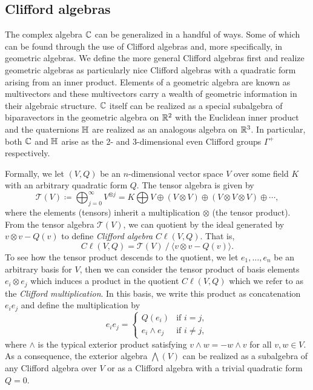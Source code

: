 \subsection{Clifford algebras}
The complex algebra $\mathbb{C}$ can be generalized in a handful of ways.  Some of which can be found through the use of Clifford algebras and, more specifically, in geometric algebras.  We define the more general Clifford algebras first and realize geometric algebras as particularly nice Clifford algebras with a quadratic form arising from an inner product. Elements of a geometric algebra are known as multivectors and these multivectors carry a wealth of geometric information in their algebraic structure. $\mathbb{C}$ itself can be realized as a special subalgebra of biparavectors in the geometric algebra on $\mathbb{R}^2$ with the Euclidean inner product and the quaternions $\mathbb{H}$ are realized as an analogous algebra on $\mathbb{R}^3$. In particular, both $\mathbb{C}$ and $\mathbb{H}$ arise as the 2- and 3-dimensional even Clifford groups $\Gamma^+$ respectively.

Formally, we let $(V,Q)$ be an $n$-dimensional vector space $V$ over some field $K$ with an arbitrary quadratic form $Q$.  The tensor algebra is given by
\[
\mathcal{T}(V) \coloneqq \bigoplus_{j=0}^\infty V^{\otimes j} = K \bigoplus V \oplus (V\otimes V) \oplus (V\otimes V \otimes V) \oplus \cdots,
\]
where the elements (tensors) inherit a multiplication $\otimes$ (the tensor product). From the tensor algebra $\mathcal{T}(V)$, we can quotient by the ideal generated by $v\otimes v - Q(v)$ to define \emph{Clifford algebra} $C\ell(V,Q)$. That is, 
\[
C\ell(V,Q) = \mathcal{T}(V) ~ / ~ \langle v \otimes v - Q(v) \rangle.
\]
To see how the tensor product descends to the quotient, we let $e_1, \dots, e_n$ be an arbitrary basis for $V$, then we can consider the tensor product of basis elements $e_i \otimes e_j$ which induces a product in the quotient $C\ell(V,Q)$ which we refer to as the \emph{Clifford multiplication}. In this basis, we write this product as concatenation $e_ie_j$ and define the multiplication by
\[
e_i e_j = \begin{cases} Q(e_i) & \textrm{if $i=j$}, \\ e_i \wedge e_j & \textrm{if $i\neq j$},\end{cases}
\]
where $\wedge$ is the typical exterior product satisfying $v\wedge w = - w\wedge v$ for all $v,w\in V$.  As a consequence, the exterior algebra $\bigwedge(V)$ can be realized as a subalgebra of any Clifford algebra over $V$ or as a Clifford algebra with a trivial quadratic form $Q=0$.  

